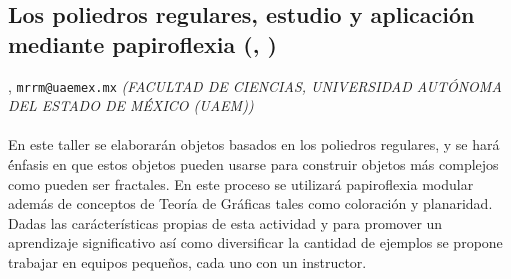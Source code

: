 \subsection{\sffamily Los poliedros regulares, estudio y aplicación mediante papiroflexia {\footnotesize (, )}} \label{reg-882} 
, {\tt mrrm@uaemex.mx}  {\slshape (FACULTAD DE CIENCIAS, UNIVERSIDAD AUTÓNOMA DEL ESTADO DE MÉXICO (UAEM))}\\
\\
\noindent En este taller se elaborar\'an objetos basados en los poliedros regulares, y se har\'a \'énfasis en que estos objetos pueden usarse para construir objetos m\'as complejos como pueden ser fractales. En este proceso se utilizar\'a papiroflexia modular adem\'as de conceptos de Teor\'ia de Gr\'aficas tales como coloraci\'on y planaridad. Dadas las carácter\'isticas propias de esta actividad y para promover un aprendizaje significativo as\'i como  diversificar la cantidad de ejemplos se propone trabajar en equipos peque\~nos, cada uno con un instructor.
